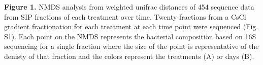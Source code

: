 \textbf{Figure 1.} NMDS analysis from weighted unifrac distances of 454 sequence data from SIP fractions of each treatment over time. Twenty fractions from a CsCl gradient fractionation for each treatment at each time point were sequenced (Fig. S1). Each point on the NMDS represents the bacterial composition based on 16S sequencing for a single fraction where the size of the point is representative of the denisty of that fraction and the colors represent the treatments (A) or days (B). 